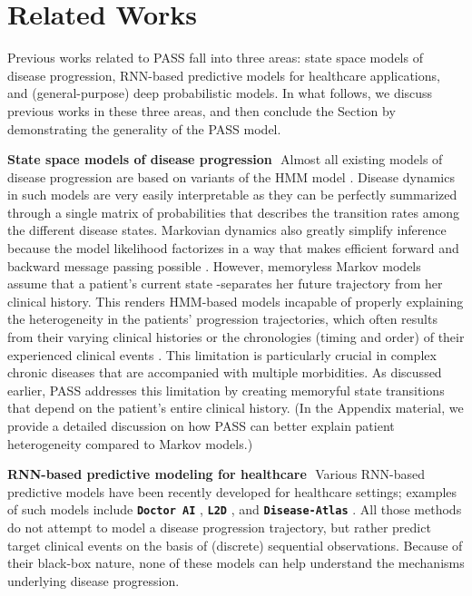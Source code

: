 \documentclass[twoside,11pt]{article}
\begin{document}
\section{Related Works}
\label{Sec2}

Previous works related to PASS fall into three areas: state space models of disease progression, RNN-based predictive models for healthcare applications, and (general-purpose) deep probabilistic models. In what follows, we discuss previous works in these three areas, and then conclude the Section by demonstrating the generality of the PASS model.

{\bf State space models of disease progression}\,\, Almost all existing models of disease progression are based on variants of the HMM model \cite{wang2014unsupervised,liu2015efficient,alaa2017learning}. Disease dynamics in such models are very easily interpretable as they can be perfectly summarized through a single matrix of probabilities that describes the transition rates among the different disease states. Markovian dynamics also greatly simplify inference because the model likelihood factorizes in a way that makes efficient forward and backward message passing possible \cite{murphy2002dynamic}. However, memoryless Markov models assume that a patient's current state -separates her future trajectory from her clinical history. This renders HMM-based models incapable of properly explaining the heterogeneity in the patients' progression trajectories, which often results from their varying clinical histories or the chronologies (timing and order) of their experienced clinical events \cite{valderas2009defining}. This limitation is particularly crucial in complex chronic diseases that are accompanied with multiple morbidities. As discussed earlier, PASS addresses this limitation by creating memoryful state transitions that depend on the patient's entire clinical history. (In the Appendix material, we provide a detailed discussion on how PASS can better explain patient heterogeneity compared to Markov models.)

{\bf RNN-based predictive modeling for healthcare}\,\, Various RNN-based predictive models have been recently developed for healthcare settings; examples of such models include \textbf{\texttt{\small Doctor AI}} \cite{choi2016doctor}, \textbf{\texttt{\small L2D}} \cite{lipton2015learning}, and \textbf{\texttt{\small Disease-Atlas}} \cite{lim2018disease}. All those methods do not attempt to model a disease progression trajectory, but rather predict target clinical events on the basis of (discrete) sequential observations. Because of their black-box nature, none of these models can help understand the mechanisms underlying disease progression. 
\end{document}
